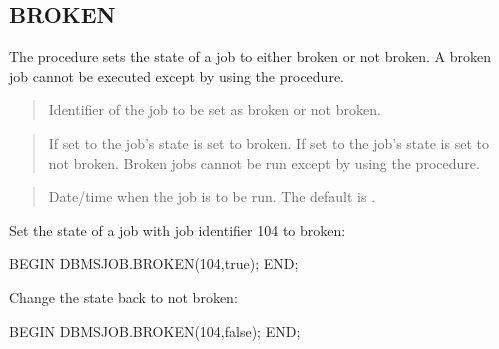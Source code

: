 \documentclass[letterpaper,10pt,english,openany,oneside]{sphinxmanual}
\begin{document}
\newpage


\subsection{BROKEN}
\label{\detokenize{broken::doc}}\label{\detokenize{broken:broken}}
The  procedure sets the state of a job to either broken or not
broken. A broken job cannot be executed except by using the 
procedure.



\begin{quote}

Identifier of the job to be set as broken or not broken.
\end{quote}

\begin{quote}

If set to  the job’s state is set to broken. If set to  the
job’s state is set to not broken. Broken jobs cannot be run except by
using the  procedure.
\end{quote}

\begin{quote}

Date/time when the job is to be run. The default is .
\end{quote}


Set the state of a job with job identifier 104 to broken:

%
\begin{sphinxVerbatim}[commandchars=\\\{\}]
BEGIN
   DBMS\PYGZus{}JOB.BROKEN(104,true);
END;
\end{sphinxVerbatim}

Change the state back to not broken:

%
\begin{sphinxVerbatim}[commandchars=\\\{\}]
BEGIN
   DBMS\PYGZus{}JOB.BROKEN(104,false);
END;
\end{sphinxVerbatim}
\end{document}
